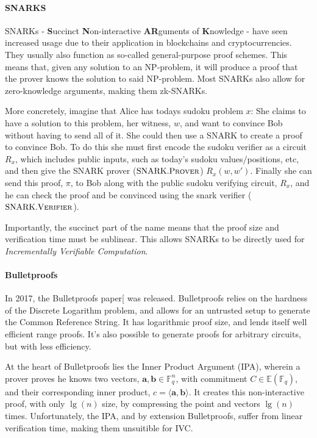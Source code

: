 \documentclass[
]{article}
\newcommand*\Fb{\mathbb{F}}
\newcommand*\Eb{\mathbb{E}}
\renewcommand{\vec}[1]{ \boldsymbol{#1} }
\newcommand{\ip}[2]{ \langle #1, #2 \rangle }
\newcommand*{\Prover}{\mathrm{\text{P\scriptsize ROVER}}}
\newcommand*{\Verifier}{\mathrm{\text{V\scriptsize ERIFIER}}}
\newcommand*{\SNARKProver}{\mathrm{\text{SNARK}}.\Prover}
\newcommand*{\SNARKVerifier}{\mathrm{\text{SNARK}}.\Verifier}
\begin{document}
\paragraph{SNARKS}\label{snarks}

SNARKs - \textbf{S}uccinct \textbf{N}on-interactive \textbf{AR}guments
of \textbf{K}nowledge - have seen increased usage due to their
application in blockchains and cryptocurrencies. They usually also
function as so-called general-purpose proof schemes. This means that,
given any solution to an NP-problem, it will produce a proof that the
prover knows the solution to said NP-problem. Most SNARKs also allow for
zero-knowledge arguments, making them zk-SNARKs.

More concretely, imagine that Alice has todays sudoku problem \(x\): She
claims to have a solution to this problem, her witness, \(w\), and want
to convince Bob without having to send all of it. She could then use a
SNARK to create a proof to convince Bob. To do this she must first
encode the sudoku verifier as a circuit \(R_x\), which includes public
inputs, such as today's sudoku values/positions, etc, and then give the
SNARK prover (\(\SNARKProver\)) \(R_x(w,w')\). Finally she can send this
proof, \(\pi\), to Bob along with the public sudoku verifying circuit,
\(R_x\), and he can check the proof and be convinced using the snark
verifier (\(\SNARKVerifier\)).

Importantly, the succinct part of the name means that the proof size and
verification time must be sublinear. This allows SNARKs to be directly
used for \emph{Incrementally Verifiable Computation}.

\paragraph{Bulletproofs}\label{bulletproofs}

In 2017, the Bulletproofs paper{[}\citeproc{ref-bulletproofs}{Bünz et
al. 2017}{]} was released. Bulletproofs relies on the hardness of the
Discrete Logarithm problem, and allows for an untrusted setup to
generate the Common Reference String. It has logarithmic proof size, and
lends itself well efficient range proofs. It's also possible to generate
proofs for arbitrary circuits, but with less efficiency.

At the heart of Bulletproofs lies the Inner Product Argument (IPA),
wherein a prover proves he knows two vectors,
\(\vec{a}, \vec{b} \in \Fb_q^n\), with commitment \(C \in \Eb(\Fb_q)\),
and their corresponding inner product, \(c = \ip{\vec{a}}{\vec{b}}\). It
creates this non-interactive proof, with only \(\lg(n)\) size, by
compressing the point and vectors \(\lg(n)\) times. Unfortunately, the
IPA, and by extension Bulletproofs, suffer from linear verification
time, making them unsuitible for IVC.
\end{document}
